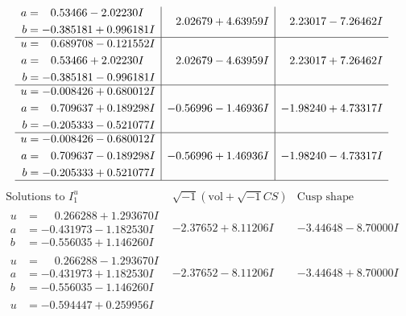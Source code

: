 \documentclass[1p]{elsarticle_modified}
\theoremstyle{definition}
\newcommand{\I}{\sqrt{-1}}
\begin{document}
$$\begin{array}{c|c|c}
\begin{aligned}
a &= \phantom{-}0.53466 - 2.02230 I \\
b &= -0.385181 + 0.996181 I\end{aligned}
 & \phantom{-}2.02679 + 4.63959 I & \phantom{-}2.23017 - 7.26462 I \\ \hline\begin{aligned}
u &= \phantom{-}0.689708 - 0.121552 I \\
a &= \phantom{-}0.53466 + 2.02230 I \\
b &= -0.385181 - 0.996181 I\end{aligned}
 & \phantom{-}2.02679 - 4.63959 I & \phantom{-}2.23017 + 7.26462 I \\ \hline\begin{aligned}
u &= -0.008426 + 0.680012 I \\
a &= \phantom{-}0.709637 + 0.189298 I \\
b &= -0.205333 - 0.521077 I\end{aligned}
 & -0.56996 - 1.46936 I & -1.98240 + 4.73317 I \\ \hline\begin{aligned}
u &= -0.008426 - 0.680012 I \\
a &= \phantom{-}0.709637 - 0.189298 I \\
b &= -0.205333 + 0.521077 I\end{aligned}
 & -0.56996 + 1.46936 I & -1.98240 - 4.73317 I\\
 \hline 
 \end{array}$$\newpage$$\begin{array}{c|c|c}  
\text{Solutions to }I^u_{1}& \I (\text{vol} + \sqrt{-1}CS) & \text{Cusp shape}\\
 \hline 
\begin{aligned}
u &= \phantom{-}0.266288 + 1.293670 I \\
a &= -0.431973 - 1.182530 I \\
b &= -0.556035 + 1.146260 I\end{aligned}
 & -2.37652 + 8.11206 I & -3.44648 - 8.70000 I \\ \hline\begin{aligned}
u &= \phantom{-}0.266288 - 1.293670 I \\
a &= -0.431973 + 1.182530 I \\
b &= -0.556035 - 1.146260 I\end{aligned}
 & -2.37652 - 8.11206 I & -3.44648 + 8.70000 I \\ \hline\begin{aligned}
u &= -0.594447 + 0.259956 I \\

\end{aligned}
\end{array}$$
\end{document}
